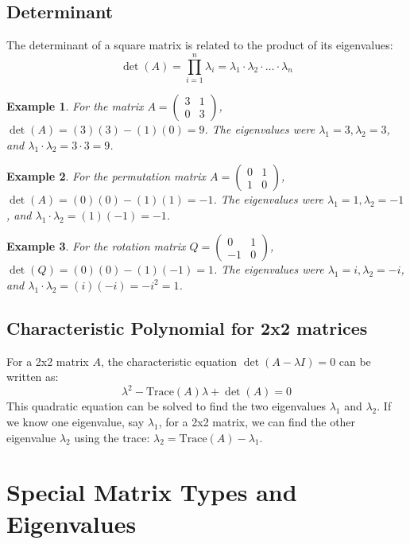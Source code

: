 \documentclass{article}
\newtheorem{example}{Example}
\begin{document}
\subsection{Determinant}
The determinant of a square matrix is related to the product of its eigenvalues:
\[\det(A) = \prod_{i=1}^{n} \lambda_i = \lambda_1 \cdot \lambda_2 \cdot \dots \cdot \lambda_n\]
\begin{example}
For the matrix $A = \begin{pmatrix} 3 & 1 \\ 0 & 3 \end{pmatrix}$, $\det(A) = (3)(3) - (1)(0) = 9$. The eigenvalues were $\lambda_1 = 3, \lambda_2 = 3$, and $\lambda_1 \cdot \lambda_2 = 3 \cdot 3 = 9$.
\end{example}
\begin{example}
For the permutation matrix $A = \begin{pmatrix} 0 & 1 \\ 1 & 0 \end{pmatrix}$, $\det(A) = (0)(0) - (1)(1) = -1$. The eigenvalues were $\lambda_1 = 1, \lambda_2 = -1$, and $\lambda_1 \cdot \lambda_2 = (1)(-1) = -1$.
\end{example}
\begin{example}
For the rotation matrix $Q = \begin{pmatrix} 0 & 1 \\ -1 & 0 \end{pmatrix}$, $\det(Q) = (0)(0) - (1)(-1) = 1$. The eigenvalues were $\lambda_1 = i, \lambda_2 = -i$, and $\lambda_1 \cdot \lambda_2 = (i)(-i) = -i^2 = 1$.
\end{example}


\subsection{Characteristic Polynomial for 2x2 matrices}
For a 2x2 matrix $A$, the characteristic equation $\det(A - \lambda I) = 0$ can be written as:
\[\lambda^2 - \text{Trace}(A)\lambda + \det(A) = 0\]
This quadratic equation can be solved to find the two eigenvalues $\lambda_1$ and $\lambda_2$.  If we know one eigenvalue, say $\lambda_1$, for a 2x2 matrix, we can find the other eigenvalue $\lambda_2$ using the trace: $\lambda_2 = \text{Trace}(A) - \lambda_1$.

\section{Special Matrix Types and Eigenvalues}
\end{document}
